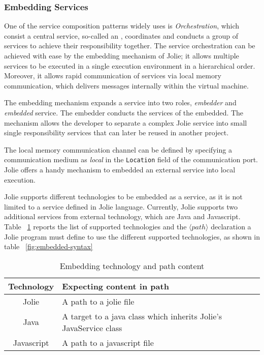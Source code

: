 \subsubsection{Embedding Services}
\label{sec:embedded}

One of the service composition patterns widely uses is \textit{Orchestration}, which consist a central service, so-called an , coordinates and conducts a group of services to achieve their responsibility together. The service orchestration can be achieved with ease by the embedding mechanism of Jolie; it allows multiple services to be executed in a single execution environment in a hierarchical order.
Moreover, it allows rapid communication of services via local memory communication, which delivers messages internally within the virtual machine.

The embedding mechanism expands a service into two roles, \textit{embedder} and \textit{embedded} service. The embedder conducts the services of the embedded. The mechanism allows the developer to separate a complex Jolie service into small single responsibility services that can later be reused in another project. 

The local memory communication channel can be defined by specifying a communication medium as \textit{local} in the \texttt{Location} field of the communication port.
Jolie offers a handy mechanism to embedded an external service into local execution.

Jolie supports different technologies to be embedded as a service, as it is not limited to a service defined in Jolie language. Currently, Jolie supports two additional services from external technology, which are Java and Javascript. Table ~\ref{table:embedded-technology-path} reports the list of supported technologies and the \(\langle path \rangle\) declaration a Jolie program must define to use the different supported technologies, as shown in table ~\ref{fig:embedded-syntax}

\begin{table}[h]
    \centering
    \begin{tabular}{ |c|l| }
        \hline
        Technology & Expecting content in path                                         \\
        \hline
        Jolie      & A path to a jolie file                                            \\
        Java       & A target to a java class which inherits Jolie's JavaService class \\
        Javascript & A path to a javascript file                                       \\
        \hline
    \end{tabular}
    \caption{Embedding technology and path content}
    \label{table:embedded-technology-path}
\end{table}


